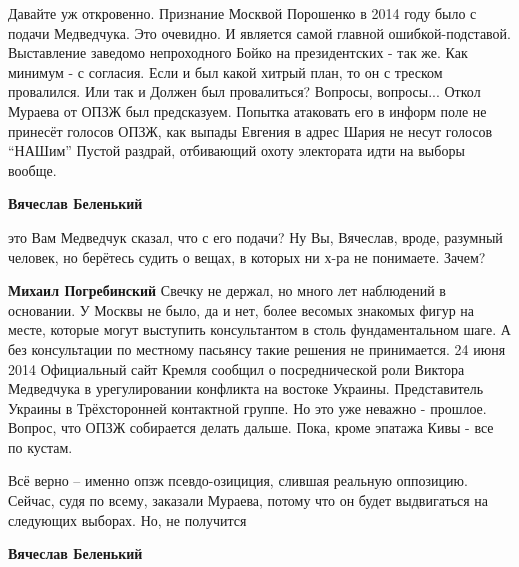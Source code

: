  
 
 
 
 
\zzSecCmt

\begin{itemize} %

Давайте уж откровенно. Признание Москвой Порошенко в 2014 году было с подачи Медведчука.
Это очевидно.
И является самой главной ошибкой-подставой.
Выставление заведомо непроходного Бойко на президентских - так же. Как минимум - с согласия.
Если и был какой хитрый план, то он с треском провалился.
Или так и Должен был провалиться?
Вопросы, вопросы...
Откол Мураева от ОПЗЖ был предсказуем.  Попытка атаковать его в информ поле не
принесёт голосов ОПЗЖ, как выпады Евгения в адрес Шария не несут голосов
\enquote{НАШим} Пустой раздрай, отбивающий охоту электората идти на выборы вообще.

\begin{itemize} %
\textbf{Вячеслав Беленький} 

это Вам Медведчук сказал, что с его подачи? Ну Вы, Вячеслав, вроде, разумный
человек, но берётесь судить о вещах, в которых ни х-ра не понимаете. Зачем?

\textbf{Михаил Погребинский}
Свечку не держал, но много лет наблюдений в основании.
У Москвы не было, да и нет, более весомых знакомых фигур на месте, которые могут выступить консультантом в столь фундаментальном шаге.
А без консультации по местному пасьянсу такие решения не принимается.
24 июня 2014
Официальный сайт Кремля сообщил о посреднической роли Виктора Медведчука в урегулировании конфликта на востоке Украины.
Представитель Украины в Трёхсторонней контактной группе.
Но это уже неважно - прошлое.
Вопрос, что ОПЗЖ собирается делать дальше.
Пока, кроме эпатажа Кивы - все по кустам.


Всё верно – именно опзж псевдо-озициция, слившая реальную оппозицию. Сейчас,
судя по всему, заказали Мураева, потому что он будет выдвигаться на следующих
выборах. Но, не получится

\textbf{Вячеслав Беленький} 


\end{itemize}
\end{itemize}

